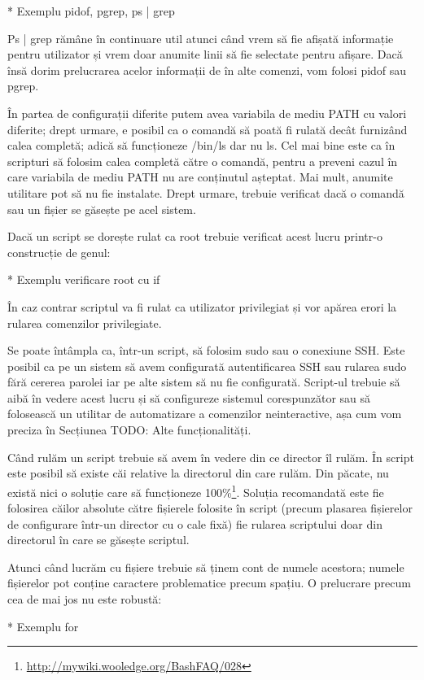* Exemplu pidof, pgrep, ps | grep

Ps | grep rămâne în continuare util atunci când vrem să fie afișată informație
pentru utilizator și vrem doar anumite linii să fie selectate pentru afișare.
Dacă însă dorim prelucrarea acelor informații de în alte comenzi, vom folosi
pidof sau pgrep.

În partea de configurații diferite putem avea variabila de mediu PATH cu valori
diferite; drept urmare, e posibil ca o comandă să poată fi rulată decât
furnizând calea completă; adică să funcționeze /bin/ls dar nu ls. Cel mai bine
este ca în scripturi să folosim calea completă către o comandă, pentru a preveni
cazul în care variabila de mediu PATH nu are conținutul așteptat. Mai mult,
anumite utilitare pot să nu fie instalate. Drept urmare, trebuie verificat dacă
o comandă sau un fișier se găsește pe acel sistem.

Dacă un script se dorește rulat ca root trebuie verificat acest lucru printr-o
construcție de genul:

* Exemplu verificare root cu if

În caz contrar scriptul va fi rulat ca utilizator privilegiat și vor apărea
erori la rularea comenzilor privilegiate.

Se poate întâmpla ca, într-un script, să folosim sudo sau o conexiune SSH. Este
posibil ca pe un sistem să avem configurată autentificarea SSH sau rularea sudo
fără cererea parolei iar pe alte sistem să nu fie configurată. Script-ul trebuie
să aibă în vedere acest lucru și să configureze sistemul corespunzător sau să
folosească un utilitar de automatizare a comenzilor neinteractive, așa cum vom
preciza în Secțiunea TODO: Alte funcționalități.

Când rulăm un script trebuie să avem în vedere din ce director îl rulăm. În
script este posibil să existe căi relative la directorul din care rulăm. Din
păcate, nu există nici o soluție care să funcționeze
100\%\footnote{\url{http://mywiki.wooledge.org/BashFAQ/028}}. Soluția
recomandată este fie folosirea căilor absolute către fișierele folosite în
script (precum plasarea fișierelor de configurare într-un director cu o cale
fixă) fie rularea scriptului doar din directorul în care se găsește scriptul.

Atunci când lucrăm cu fișiere trebuie să ținem cont de numele acestora; numele
fișierelor pot conține caractere problematice precum spațiu. O prelucrare precum
cea de mai jos nu este robustă:

* Exemplu for

